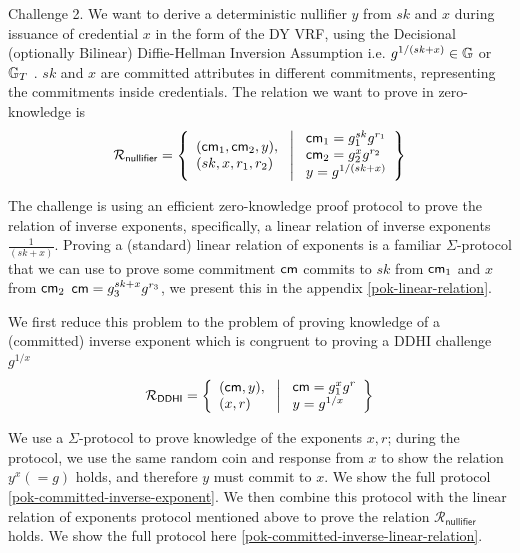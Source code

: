 Challenge 2. 
We want to derive a deterministic nullifier $y$ from $sk$ and $x$ during issuance of credential $x$ in the form of the DY VRF, using the Decisional (optionally Bilinear) Diffie-Hellman Inversion Assumption i.e. $g^{1/(sk + x)} \in \mathbb{G}$ or $\mathbb{G}_T$ . $sk$ and $x$ are committed attributes in different commitments, representing the commitments inside credentials. The relation we want to prove in zero-knowledge is
\[
\mathcal{R}_{\mathsf{nullifier}} = \left\{ 
\begin{array}{l} (\mathsf{cm}_1, \mathsf{cm}_2, y),\\
(sk, x, r_1, r_2) 
\end{array}
\ \middle|
\ \begin{array}{l}
\mathsf{cm}_1 = g_1^{sk} g^{r_1} \\
\mathsf{cm}_2 = g_2^{x} g^{r_2} \\
y = g^{1/(sk + x)} \\
\end{array} \right\}
\]

The challenge is using an efficient zero-knowledge proof protocol to prove the relation of inverse exponents, specifically, a linear relation of inverse exponents $\frac{1}{(sk + x)}$. Proving a (standard) linear relation of exponents is a familiar $\Sigma$-protocol that we can use to prove some commitment $\mathsf{cm}$ commits to $sk$ from $\mathsf{cm}_1$ and $x$ from $\mathsf{cm}_2$ $\mathsf{cm} = g_3^{sk+x}g^{r_3}$, we present this in the appendix \ref{pok-linear-relation}. 

We first reduce this problem to the problem of proving knowledge of a (committed) inverse exponent which is congruent to proving a DDHI challenge $g^{1/x}$
\[
\mathcal{R}_{\mathsf{DDHI}} = \left\{ 
\begin{array}{l} (\mathsf{cm}, y),\\
(x, r) 
\end{array}
\ \middle|
\ \begin{array}{l}
\mathsf{cm} = g_1^{x} g^r \\
y = g^{1/x} \\
\end{array} \right\}
\]


We use a $\Sigma$-protocol to prove knowledge of the exponents $x, r$; during the protocol, we use the same random coin and response from $x$ to show the relation $y^x (=g)$ holds, and therefore $y$ must commit to $x$. We show the full protocol \ref{pok-committed-inverse-exponent}. We then combine this protocol with the linear relation of exponents protocol mentioned above to prove the relation $\mathcal{R}_{\mathsf{nullifier}}$ holds. We show the full protocol here \ref{pok-committed-inverse-linear-relation}.

